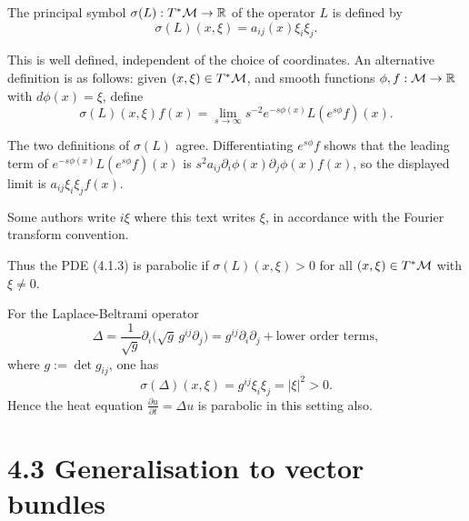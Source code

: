 \begin{definition}
\label{topping-pde-principal-symbol-scalar}
The principal symbol $\sigma(L) : T^*\mathcal{M} \to \mathbb R$ of the operator $L$ is
defined by
\[
\sigma(L)(x,\xi) = a_{ij}(x)\xi_i\xi_j.
\]
\end{definition}

This is well defined, independent of the choice of coordinates. An alternative
definition is as follows: given $(x,\xi) \in T^*\mathcal{M}$, and smooth functions
$\phi,f : \mathcal{M} \to \mathbb R$ with $d\phi(x)=\xi$, define
\[
\sigma(L)(x,\xi)f(x) = \lim_{s \to \infty} s^{-2}e^{-s\phi(x)}
L(e^{s\phi}f)(x).
\tag{4.2.2}
\]

\begin{remark}
\label{topping-pde-principal-symbol-limit-justification}
The two definitions of $\sigma(L)$ agree. Differentiating $e^{s\phi}f$ shows
that the leading term of $e^{-s\phi(x)}L(e^{s\phi}f)(x)$ is
$s^2 a_{ij}\partial_i\phi(x)\partial_j\phi(x)f(x)$, so the displayed limit is
$a_{ij}\xi_i\xi_j f(x)$.
\end{remark}

\begin{remark}
\label{topping-pde-principal-symbol-fourier-convention}
Some authors write $i\xi$ where this text writes $\xi$, in accordance with the
Fourier transform convention.
\end{remark}

Thus the PDE (4.1.3) is parabolic if $\sigma(L)(x,\xi) > 0$ for all
$(x,\xi)\in T^*\mathcal{M}$ with $\xi\neq 0$.

\begin{example}
\label{topping-pde-laplace-beltrami-example}
For the Laplace-Beltrami operator
\[
\Delta=\frac{1}{\sqrt{g}}\partial_i\bigl(\sqrt{g}\,g^{ij}\partial_j\bigr)
= g^{ij}\partial_i\partial_j + \text{lower order terms},
\]
where $g:=\det g_{ij}$, one has
\[
\sigma(\Delta)(x,\xi)=g^{ij}\xi_i\xi_j=|\xi|^2>0.
\]
Hence the heat equation $\frac{\partial u}{\partial t}=\Delta u$ is parabolic
in this setting also.
\end{example}

\section*{4.3 \quad Generalisation to vector bundles}

